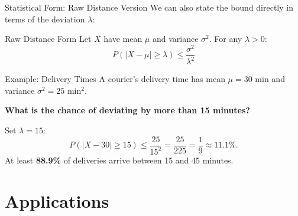 \documentclass{beamer}
\begin{document}
\begin{frame}{Statistical Form: Raw Distance Version}
    We can also state the bound directly in terms of the deviation $\lambda$:

    \begin{block}{Raw Distance Form}
        Let $X$ have mean $\mu$ and variance $\sigma^2$. For any $\lambda > 0$:
        \[
            P(|X - \mu| \geq \lambda) \leq \frac{\sigma^2}{\lambda^2}
        \]
    \end{block}

    \begin{exampleblock}{Example: Delivery Times}
        A courier's delivery time has mean $\mu = 30$ min and variance $\sigma^2 = 25$ min$^2$.

        \vspace{0.2cm}
        \textbf{What is the chance of deviating by more than 15 minutes?}

        \vspace{0.2cm}
        Set $\lambda = 15$:
        \[
            P(|X - 30| \geq 15) \leq \frac{25}{15^2} = \frac{25}{225} = \frac{1}{9} \approx 11.1\%.
        \]
        At least \textbf{88.9\%} of deliveries arrive between 15 and 45 minutes.
    \end{exampleblock}
\end{frame}

\section{Applications}
\end{document}
